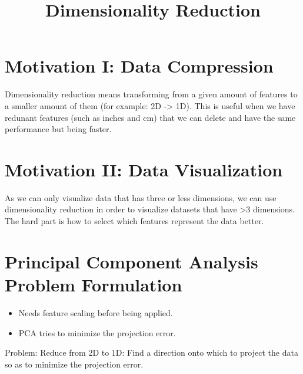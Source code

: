 \documentclass[10pt]{extarticle}
\begin{document}
 



\title{Dimensionality Reduction}

    
    \date{}
    

    

    \maketitle

\newpage





\section{Motivation I: Data
Compression}\label{motivation-i-data-compression}

Dimensionality reduction means transforming from a given amount of
features to a smaller amount of them (for example: 2D -\textgreater{}
1D). This is useful when we have redunant features (such as inches and
cm) that we can delete and have the same performance but being faster.

\section{Motivation II: Data
Visualization}\label{motivation-ii-data-visualization}

As we can only visualize data that has three or less dimensions, we can
use dimensionality reduction in order to visualize datasets that have
\textgreater{}3 dimensions. The hard part is how to select which
features represent the data better.

\section{Principal Component Analysis Problem
Formulation}\label{principal-component-analysis-problem-formulation}

\begin{itemize}
\itemsep1pt\parskip0pt
\item
  Needs feature scaling before being applied.
\item
  PCA tries to minimize the projection error.
\end{itemize}

Problem: Reduce from 2D to 1D: Find a direction onto which to project
the data so as to minimize the projection error. \smallskip
\end{document}
